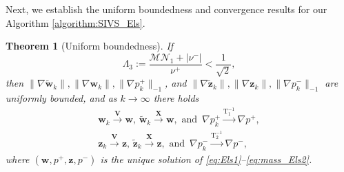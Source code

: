 \documentclass[3p]{elsarticle}
\newtheorem{theorem}{Theorem}
\def\nuplus{\nu^{+}}
\def\numinus{\nu^{-}}
\def\pplus{p^{+}}
\def\pminus{p^{-}}
\def\V#1{\mathbf{#1}}
\def\Vt#1{\mathbf{\tilde{#1}}}
\newcommand{\Mbd}{\mathcal{M}}
\newcommand{\Nbd}{\mathcal{N}}
\newcommand{\Luinvmap}{\mathrm{T_1^{-1}}}
\newcommand{\Lbinvmap}{\mathrm{T_2^{-1}}}
\begin{document}
Next, we establish the uniform boundedness and convergence results for our Algorithm \ref{algorithm:SIVS_Els}.
\begin{theorem}[Uniform boundedness]\label{boundedness}
If 
%
\begin{equation}
	\Lambda_3 := \frac{\Mbd \Nbd_1+|\numinus|}{\nuplus} < \frac{1}{\sqrt{2}},
    \label{eq:smalldata_Els}
\end{equation}
%
%
then $\| \nabla \Vt{w}_k\|, \| \nabla \V{w}_k\| , \| \nabla \pplus_k\|_{-1}$, and  $\| \nabla \Vt{z}_k\|, \| \nabla \V{z}_k\| , \| \nabla \pminus_k\|_{-1}$ are uniformly bounded, and as $k \rightarrow \infty$ there holds 
\begin{equation}
    \label{eq:ErrConv_Els}
    \begin{aligned}
\V{w}_k \xrightarrow{\V{V}} \V{w}, \, \Vt{w}_k \xrightarrow{\V{X}} \V{w}, \text{ and } \, \nabla \pplus_k \xrightarrow{\Luinvmap} \nabla \pplus, \\
\V{z}_k \xrightarrow{\V{V}} \V{z}, \, \Vt{z}_k \xrightarrow{\V{X}} \V{z}, \text{ and } \, \nabla \pminus_k \xrightarrow{\Lbinvmap} \nabla \pminus,
    \end{aligned}
\end{equation}
where $(\V{w},\pplus,\V{z},\pminus)$ is the unique solution of  \eqref{eq:Els1}--\eqref{eq:mass_Els2}.
\end{theorem} 
%
%
\end{document}
